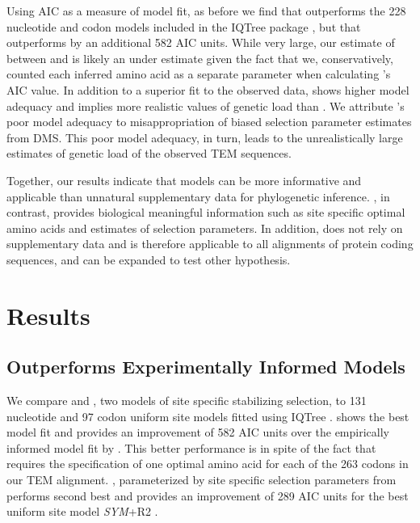 Using AIC as a measure of model fit, as before we find that \phydms outperforms the 228 nucleotide and codon models included in the IQTree package \citep{bloom2014, bloom2017}, but that \selac outperforms \phydms by an additional 582 AIC units.
While very large, our estimate of \DeltaAIC between \selac and \phydms is likely an under estimate given the fact that we, conservatively, counted each inferred amino acid as a separate parameter when calculating \selac's AIC value.
In addition to a superior fit to the observed data, \selac shows higher model adequacy and implies more realistic values of genetic load than \phydms.
We attribute \phydms's poor model adequacy to misappropriation of biased selection parameter estimates from DMS. 
This poor model adequacy, in turn, leads to the unrealistically large estimates of genetic load of the observed TEM sequences.

Together, our results indicate that models can be more informative and applicable than unnatural supplementary data for phylogenetic inference.
\selac, in contrast, provides biological meaningful information such as site specific optimal amino acids and estimates of selection parameters.
In addition, \selac does not rely on supplementary data and is therefore applicable to all alignments of protein coding sequences, and can be expanded to test other hypothesis.


\section{Results}
\subsection{\selac Outperforms Experimentally Informed Models}

We compare \selac and \phydms, two models of site specific stabilizing selection, to 131 nucleotide and 97 codon uniform site models fitted using IQTree \citep[][see Table \ref{tab:AIC_selac} for the best performing models and Table \ref{tab:AIC_full} for all models]{nguyen2015}.
\selac shows the best model fit and provides an improvement of 582 AIC units over the empirically informed model fit by \phydms.
This better performance is in spite of the fact that \selac requires the specification of one optimal amino acid for each of the 263 codons in our TEM alignment.
\phydms, parameterized by site specific selection parameters from \citet{stiffler2016} performs second best and provides an improvement of 289 AIC units for the best uniform site model \emph{SYM}+R2 \citet{zharkikh1994}. 

